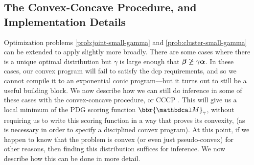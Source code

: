 \begin{subappendices}
\section{The Convex-Concave Procedure, and Implementation Details}
    \label{sec:cccp}

Optimization problems \eqref{prob:joint-small-gamma} and \eqref{prob:cluster-small-gamma}
can be extended to apply slightly more broadly.
There are some cases where there is a unique optimal distribution
but $\gamma$ is large
enough that $\boldsymbol\beta \not\ge \gamma\boldsymbol\alpha$.
In these cases, our convex program will fail to satisfy the dcp requirements, and
    so we cannot compile it to an exponential conic program---but
    it turns out to still be a useful building block.
We now describe how we can still do inference in some of these cases with the
    convex-concave procedure, or CCCP \parencite{yuille2003concave}.
This will give us a local minimum of the
    PDG scoring function $\bbr{\dg M}_\gamma$,
    without requiring us to write this scoring function
    in a way that proves its convexity,
    (as is necessary in order to specify a disciplined convex program).
At this point, if we happen to know that the problem is convex (or even
    just pseudo-convex) for other reasons, then finding this distribution
    suffices for inference.
We now describe how this can be done in more detail.




\end{subappendices}
